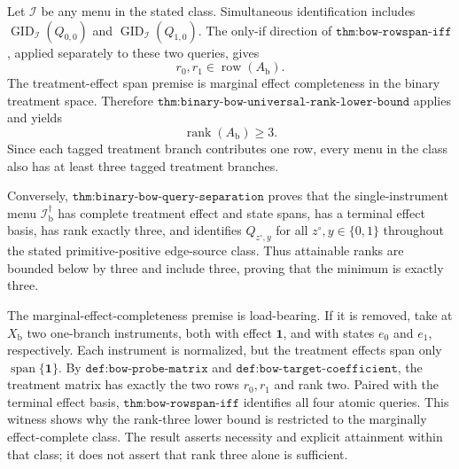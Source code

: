 Let \(\mathcal I\) be any menu in the stated class.  Simultaneous
identification includes
\(\operatorname{GID}_{\mathcal I}(Q_{0,0})\) and
\(\operatorname{GID}_{\mathcal I}(Q_{1,0})\).  The only-if direction of
\(\texttt{thm:bow-rowspan-iff}\), applied separately to these two queries,
gives
\[
 r_0,r_1\in\operatorname{row}(A_{\mathrm b}).
\]
The treatment-effect span premise is marginal effect completeness in the
binary treatment space.  Therefore
\(\texttt{thm:binary-bow-universal-rank-lower-bound}\) applies and yields
\[
 \operatorname{rank}(A_{\mathrm b})\ge3.
\]
Since each tagged treatment branch contributes one row, every menu in the
class also has at least three tagged treatment branches.

Conversely, \(\texttt{thm:binary-bow-query-separation}\) proves that the
single-instrument menu \(\mathcal I_{\mathrm b}^{\dagger}\) has complete
treatment effect and state spans, has a terminal effect basis, has rank
exactly three, and identifies \(Q_{z^{\circ},y}\) for all
\(z^{\circ},y\in\{0,1\}\) throughout the stated primitive-positive
edge-source class.  Thus attainable ranks are bounded below by three and
include three, proving that the minimum is exactly three.

The marginal-effect-completeness premise is load-bearing.  If it is removed,
take at \(X_{\mathrm b}\) two one-branch instruments, both with effect
\(\mathbf 1\), and with states \(e_0\) and \(e_1\), respectively.  Each
instrument is normalized, but the treatment effects span only
\(\operatorname{span}\{\mathbf 1\}\).  By
\(\texttt{def:bow-probe-matrix}\) and
\(\texttt{def:bow-target-coefficient}\), the treatment matrix has exactly
the two rows \(r_0,r_1\) and rank two.  Paired with the terminal effect
basis, \(\texttt{thm:bow-rowspan-iff}\) identifies all four atomic queries.
This witness shows why the rank-three lower bound is restricted to the
marginally effect-complete class.  The result asserts necessity and explicit
attainment within that class; it does not assert that rank three alone is
sufficient.